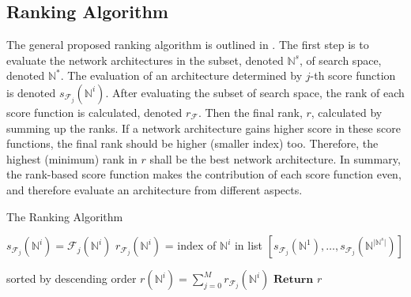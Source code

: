 \documentclass[sigconf]{acmart}
\begin{document}
    \subsection{Ranking Algorithm}

    The general proposed ranking algorithm is outlined in . 
    The first step is to evaluate the network architectures in the subset, 
    denoted $\mathbb N^s$, of search space, denoted $\mathbb N^*$. The 
    evaluation of an architecture determined by $j$-th score function is 
    denoted $s_{\mathcal F_j}(\mathbb N^i)$. After evaluating the subset 
    of search space, the rank of each score function is calculated, denoted 
    $r_{\mathcal F}$. Then the final rank, $r$, calculated by summing up 
    the ranks. If a network architecture gains higher score in these score 
    functions, the final rank should be higher (smaller index) too. Therefore, 
    the highest (minimum) rank in $r$ shall be the best network architecture. 
    In summary, the rank-based score function makes the contribution of 
    each score function even, and therefore evaluate an architecture from 
    different aspects. 

    \begin{algorithm}[h]
        \caption{The Ranking Algorithm}\label{alg:rank-based}
        \begin{algorithmic}[1]
                    \State $s_{{\mathcal F}_{j}}({\mathbb N}^i)={\mathcal F}_{j}({\mathbb N}^i)$
                \EndFor
            \EndFor
                \State $r_{{\mathcal F}_{j}}({\mathbb N}^i)$ = index of ${\mathbb N}^i$ in list $[s_{{\mathcal F}_{j}}({\mathbb N}^1),\ldots,s_{{\mathcal F}_{j}}({\mathbb N}^{\lvert {\mathbb N}^s\rvert})]$ \par sorted by descending order
            \EndFor
            \State $r({\mathbb N}^i)=\sum^M_{j=0} r_{{\mathcal F}_{j}}({\mathbb N}^i)$
            \State $\textbf{Return }r$
        \end{algorithmic}
    \end{algorithm}
\end{document}

